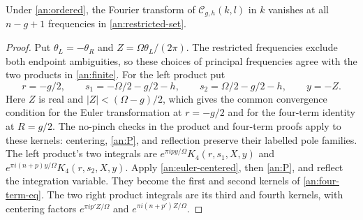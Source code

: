 \begin{proposition}\label{an:restricted}
Under \eqref{an:ordered}, the Fourier transform of
$\mathcal C_{g,h}(k,l)$ in $k$ vanishes at all $n-g+1$ frequencies
in \eqref{an:restricted-set}.
\end{proposition}

\begin{proof}
Put $\theta_L=-\theta_R$ and $Z=\Omega\theta_L/(2\pi)$.
The restricted frequencies exclude both endpoint ambiguities, so these
choices of principal frequencies agree with the two products in
\eqref{an:finite}.  For the left product put
\[
 r=-g/2,\qquad s_1=-\Omega/2-g/2-h,\qquad
 s_2=\Omega/2-g/2-h,\qquad y=-Z.
\]
Here $Z$ is real and $|Z|<(\Omega-g)/2$, which gives the common
convergence condition for the Euler transformation at $r=-g/2$ and
for the four-term identity at $R=g/2$.  The no-pinch checks in the
product and four-term proofs apply to these kernels: centering,
\eqref{an:P}, and reflection preserve their labelled pole families.
The left product's two integrals are
$e^{\pi ipy/\Omega}K_4(r,s_1,X,y)$ and
$e^{\pi i(n+p)y/\Omega}K_4(r,s_2,X,y)$.
Apply \eqref{an:euler-centered}, then \eqref{an:P}, and reflect
the integration variable.  They become the first and second kernels
of \eqref{an:four-term-eq}.  The two right product integrals are
its third and fourth kernels, with centering factors
$e^{\pi ip'Z/\Omega}$ and $e^{\pi i(n+p')Z/\Omega}$.


\end{proof}
